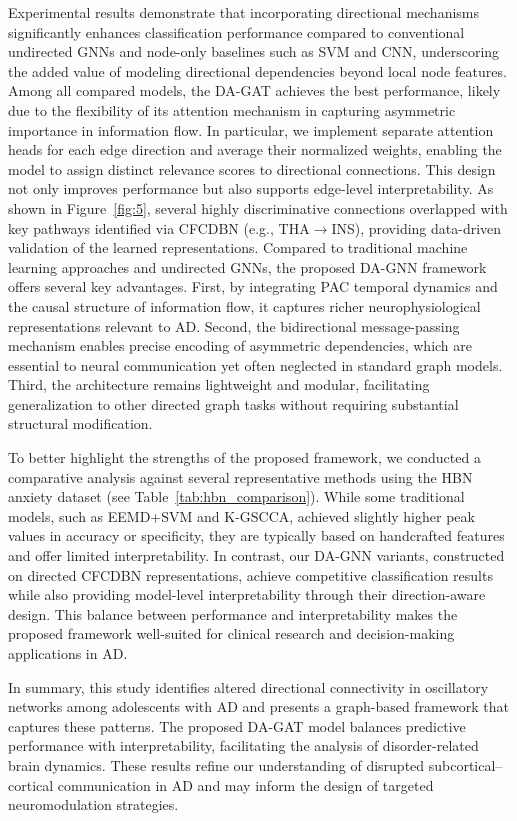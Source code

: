 \documentclass[lettersize,journal]{IEEEtran}
\begin{document}
Experimental results demonstrate that incorporating directional mechanisms significantly enhances classification performance compared to conventional undirected GNNs and node-only baselines such as SVM and CNN, underscoring the added value of modeling directional dependencies beyond local node features. Among all compared models, the DA-GAT achieves the best performance, likely due to the flexibility of its attention mechanism in capturing asymmetric importance in information flow. In particular, we implement separate attention heads for each edge direction and average their normalized weights, enabling the model to assign distinct relevance scores to directional connections. This design not only improves performance but also supports edge-level interpretability. As shown in Figure~\ref{fig:5}, several highly discriminative connections overlapped with key pathways identified via CFCDBN (e.g., THA$\rightarrow$INS), providing data-driven validation of the learned representations.
Compared to traditional machine learning approaches and undirected GNNs, the proposed DA-GNN framework offers several key advantages.  
First, by integrating PAC temporal dynamics and the causal structure of information flow, it captures richer neurophysiological representations relevant to AD.  
Second, the bidirectional message-passing mechanism enables precise encoding of asymmetric dependencies, which are essential to neural communication yet often neglected in standard graph models.
Third, the architecture remains lightweight and modular, facilitating generalization to other directed graph tasks without requiring substantial structural modification.

To better highlight the strengths of the proposed framework, we conducted a comparative analysis against several representative methods using the HBN anxiety dataset (see Table~\ref{tab:hbn_comparison}). While some traditional models, such as EEMD+SVM and K-GSCCA, achieved slightly higher peak values in accuracy or specificity, they are typically based on handcrafted features and offer limited interpretability. In contrast, our DA-GNN variants, constructed on directed CFCDBN representations, achieve competitive classification results while also providing model-level interpretability through their direction-aware design. This balance between performance and interpretability makes the proposed framework well-suited for clinical research and decision-making applications in AD.

In summary, this study identifies altered directional connectivity in oscillatory networks among adolescents with AD and presents a graph-based framework that captures these patterns. The proposed DA-GAT model balances predictive performance with interpretability, facilitating the analysis of disorder-related brain dynamics. These results refine our understanding of disrupted subcortical–cortical communication in AD and may inform the design of targeted neuromodulation strategies.
\end{document}
